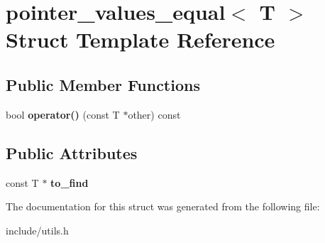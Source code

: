 \hypertarget{structpointer__values__equal}{}\section{pointer\+\_\+values\+\_\+equal$<$ T $>$ Struct Template Reference}
\label{structpointer__values__equal}
\subsection*{Public Member Functions}
\begin{DoxyCompactItemize}
\item 
\mbox{\label{structpointer__values__equal_af5907ba14fa25c5714e6b032122b9c1b}} 
bool {\bfseries operator()} (const T $\ast$other) const
\end{DoxyCompactItemize}
\subsection*{Public Attributes}
\begin{DoxyCompactItemize}
\item 
\mbox{\label{structpointer__values__equal_a08b86fa4873efed09a79b79786164f29}} 
const T $\ast$ {\bfseries to\+\_\+find}
\end{DoxyCompactItemize}


The documentation for this struct was generated from the following file\+:\begin{DoxyCompactItemize}
\item 
include/utils.\+h\end{DoxyCompactItemize}
